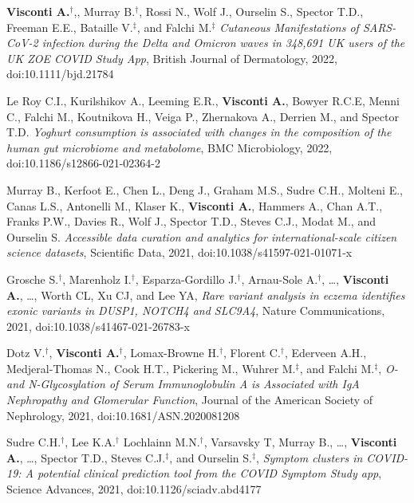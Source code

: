 \documentclass[a4paper,10pt]{article}
\begin{document}
{\begin{itemize}
	   	\textbf{Visconti A.}$^{\textbf{$\dag $}}$,, Murray B.$^{\textbf{$\dag $}}$, Rossi N., Wolf J., Ourselin S., Spector T.D., Freeman E.E., Bataille V.$^{\textbf{$\ddag $}}$, and Falchi M.$^{\textbf{$\ddag $}}$ \emph{Cutaneous Manifestations of SARS-CoV-2 infection during the Delta and Omicron waves in 348,691 UK users of the UK ZOE COVID Study App}, British Journal of Dermatology, 2022, doi:10.1111/bjd.21784
	   
	   Le Roy C.I., Kurilshikov A., Leeming E.R., \textbf{Visconti A.}, Bowyer R.C.E, Menni C., Falchi M., Koutnikova H., Veiga P., Zhernakova A., Derrien M., and Spector T.D. \emph{Yoghurt consumption is associated with changes in the composition of the human gut microbiome and metabolome}, BMC Microbiology, 2022, doi:10.1186/s12866-021-02364-2
	
	   Murray B., Kerfoot E., Chen L., Deng J., Graham M.S., Sudre C.H., Molteni E., Canas L.S., Antonelli M., Klaser K., \textbf{Visconti A.}, Hammers A., Chan A.T., Franks P.W., Davies R., Wolf J., Spector T.D., Steves C.J., Modat M., and Ourselin S. \emph{Accessible data curation and analytics for international-scale citizen science datasets}, Scientific Data, 2021, doi:10.1038/s41597-021-01071-x

	    Grosche S.$^{\textbf{$\dag $}}$, Marenholz I.$^{\textbf{$\dag $}}$, Esparza-Gordillo J.$^{\textbf{$\dag $}}$, Arnau-Sole A.$^{\textbf{$\dag $}}$, \dots, \textbf{Visconti A.}, \dots, Worth CL, Xu CJ, and Lee YA, \emph{Rare variant analysis in eczema identifies exonic variants in DUSP1, NOTCH4 and SLC9A4}, Nature Communications, 2021, doi:10.1038/s41467-021-26783-x

	    Dotz V.$^{\textbf{$\dag $}}$, \textbf{Visconti A.}$^{\textbf{$\dag $}}$, Lomax-Browne H.$^{\textbf{$\dag $}}$, Florent C.$^{\textbf{$\dag $}}$, Ederveen A.H., Medjeral-Thomas N., Cook H.T., Pickering M.,  Wuhrer M.$^{\textbf{$\ddag $}}$, and Falchi M.$^{\textbf{$\ddag $}}$, \emph{O- and N-Glycosylation of Serum Immunoglobulin A is Associated with IgA Nephropathy and Glomerular Function}, Journal of the American Society of Nephrology, 2021, doi:10.1681/ASN.2020081208

		 Sudre C.H.$^{\textbf{$\dag $}}$, Lee K.A.$^{\textbf{$\dag $}}$ Lochlainn M.N.$^{\textbf{$\dag $}}$, Varsavsky T, Murray B., \dots, \textbf{Visconti A.}, \dots, Spector T.D., Steves C.J.$^{\textbf{$\ddag $}}$, and Ourselin S.$^{\textbf{$\ddag $}}$, \emph{Symptom clusters in COVID-19: A potential clinical prediction tool from the COVID Symptom Study app}, Science Advances, 2021, doi:10.1126/sciadv.abd4177
		
	\end{itemize}
}
\end{document}
